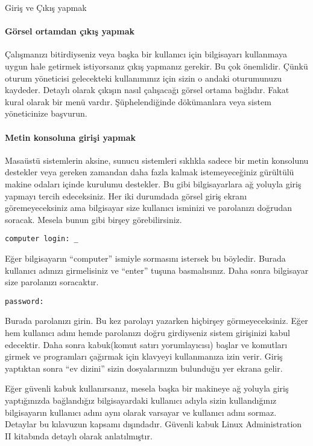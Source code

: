 \begin{section}{Giriş ve Çıkış yapmak}
\paragraph{Görsel ortamdan çıkış yapmak}{Çalışmanızı bitirdiyseniz veya başka bir kullanıcı için bilgisayarı kullanmaya uygun hale getirmek istiyorsanız çıkış yapmanız gerekir. Bu çok önemlidir. Çünkü oturum yöneticisi gelecekteki kullanımınız için sizin o andaki oturumunuzu kaydeder. Detaylı olarak çıkışın nasıl çalışacağı görsel ortama bağlıdır. Fakat kural olarak bir menü vardır. Şüphelendiğinde dökümanlara veya sistem yöneticinize başvurun.}

\paragraph{Metin konsoluna girişi yapmak}{Masaüstü sistemlerin aksine, sunucu sistemleri sıklıkla sadece bir metin konsolunu destekler veya gereken zamandan daha fazla kalmak istemeyeceğiniz gürültülü makine odaları içinde kurulumu destekler. Bu gibi bilgisayarlara ağ yoluyla giriş yapmayı tercih edeceksiniz. Her iki durumdada görsel giriş ekranı göremeyeceksiniz ama bilgisayar size kullanıcı isminizi ve parolanızı doğrudan soracak. Mesela bunun gibi birşey görebilirsiniz.}

\begin{verbatim}
computer login: _
\end{verbatim}

Eğer bilgisayarın “computer” ismiyle sormasını istersek bu böyledir. Burada kullanıcı adınızı girmelisiniz ve “enter” tuşuna basmalısınız. Daha sonra bilgisayar size parolanızı soracaktır. 

\begin{verbatim}
password:
\end{verbatim}

Burada parolanızı girin. Bu kez parolayı yazarken hiçbirşey görmeyeceksiniz. Eğer hem kullanıcı adını hemde parolanızı doğru girdiyseniz sistem girişinizi kabul edecektir. Daha sonra kabuk(komut satırı yorumlayıcısı) başlar ve komutları girmek ve programları çağırmak için klavyeyi kullanmanıza izin verir. Giriş yaptıktan sonra “ev dizini” sizin dosyalarınızın bulunduğu yer ekrana gelir.

Eğer güvenli kabuk kullanırsanız, mesela başka bir makineye ağ yoluyla giriş yaptığınızda bağlandığız bilgisayardaki kullanıcı adıyla sizin kullandığınız bilgisayarın kullanıcı adını aynı olarak varsayar ve kullanıcı adını sormaz. Detaylar bu kılavuzun kapsamı dışındadır. Güvenli kabuk Linux Administration II kitabında detaylı olarak anlatılmıştır.


\end{section}

